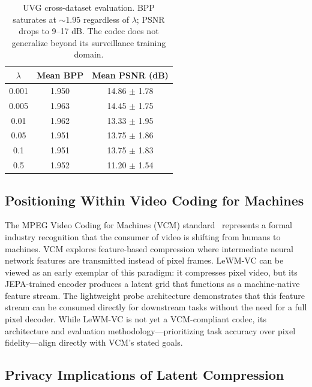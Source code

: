 \documentclass{article}
\begin{document}
\begin{table}[ht]
\centering
\caption{UVG cross-dataset evaluation. BPP saturates at ${\sim}1.95$ regardless of $\lambda$; PSNR drops to 9--17 dB. The codec does not generalize beyond its surveillance training domain.}
\label{tab:uvg}
\vspace{4pt}
\begin{tabular}{ccc}
\toprule
$\lambda$ & Mean BPP & Mean PSNR (dB) \\
\midrule
0.001 & 1.950 & 14.86 $\pm$ 1.78 \\
0.005 & 1.963 & 14.45 $\pm$ 1.75 \\
0.01  & 1.962 & 13.33 $\pm$ 1.95 \\
0.05  & 1.951 & 13.75 $\pm$ 1.86 \\
0.1   & 1.951 & 13.75 $\pm$ 1.83 \\
0.5   & 1.952 & 11.20 $\pm$ 1.54 \\
\bottomrule
\end{tabular}
\end{table}

\subsection{Positioning Within Video Coding for Machines}

The MPEG Video Coding for Machines (VCM) standard~\cite{MPEG2023VCM} represents a formal industry recognition that the consumer of video is shifting from humans to machines. VCM explores feature-based compression where intermediate neural network features are transmitted instead of pixel frames. LeWM-VC can be viewed as an early exemplar of this paradigm: it compresses pixel video, but its JEPA-trained encoder produces a latent grid that functions as a machine-native feature stream. The lightweight probe architecture demonstrates that this feature stream can be consumed directly for downstream tasks without the need for a full pixel decoder. While LeWM-VC is not yet a VCM-compliant codec, its architecture and evaluation methodology---prioritizing task accuracy over pixel fidelity---align directly with VCM's stated goals.

\subsection{Privacy Implications of Latent Compression}
\label{sec:privacy}
\end{document}
